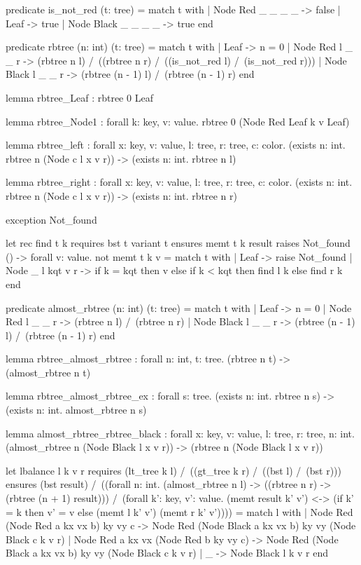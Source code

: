 \begin{whylang}
  predicate is_not_red (t: tree) =
 match t with
 | Node Red _ _ _ _ -> false
 | Leaf -> true
 | Node Black _ _ _ _ -> true
  end

  predicate rbtree (n: int) (t: tree) =
 match t with
 | Leaf -> n = 0
 | Node Red l _ _ r -> (rbtree n l) /\ ((rbtree n r) /\ ((is_not_red l) /\ (is_not_red r)))
 | Node Black l _ _ r -> (rbtree (n - 1) l) /\ (rbtree (n - 1) r)
  end

  lemma rbtree_Leaf : rbtree 0 Leaf

  lemma rbtree_Node1 : forall k: key, v: value. rbtree 0 (Node Red Leaf k v Leaf)

  lemma rbtree_left : forall x: key, v: value, l: tree, r: tree, c: color. (exists n: int. rbtree n (Node c l x v r)) -> (exists n: int. rbtree n l)

  lemma rbtree_right : forall x: key, v: value, l: tree, r: tree, c: color. (exists n: int. rbtree n (Node c l x v r)) -> (exists n: int. rbtree n r)

  exception Not_found

  let rec find t k
  requires { bst t }
  variant { t }
  ensures { memt t k result }
  raises { Not_found () -> forall v: value. not memt t k v } 
 = match t with
  | Leaf -> raise Not_found
  | Node _ l kqt v r -> if k = kqt then v else if k < kqt then find l k else find r k
  end

  predicate almost_rbtree (n: int) (t: tree) =
 match t with
 | Leaf -> n = 0
 | Node Red l _ _ r -> (rbtree n l) /\ (rbtree n r)
 | Node Black l _ _ r -> (rbtree (n - 1) l) /\ (rbtree (n - 1) r)
  end

  lemma rbtree_almost_rbtree : forall n: int, t: tree. (rbtree n t) -> (almost_rbtree n t)

  lemma rbtree_almost_rbtree_ex : forall s: tree. (exists n: int. rbtree n s) -> (exists n: int. almost_rbtree n s)

  lemma almost_rbtree_rbtree_black : forall x: key, v: value, l: tree, r: tree, n: int. (almost_rbtree n (Node Black l x v r)) -> (rbtree n (Node Black l x v r))

  let lbalance l k v r
  requires { (lt_tree k l) /\ ((gt_tree k r) /\ ((bst l) /\ (bst r))) }
  ensures { (bst result) /\ ((forall n: int. (almost_rbtree n l) -> ((rbtree n r) -> (rbtree (n + 1) result))) /\ (forall k': key, v': value. (memt result k' v') <-> (if k' = k then v' = v else (memt l k' v') \/ (memt r k' v')))) } 
 = match l with
  | Node Red (Node Red a kx vx b) ky vy c -> Node Red (Node Black a kx vx b) ky vy (Node Black c k v r)
  | Node Red a kx vx (Node Red b ky vy c) -> Node Red (Node Black a kx vx b) ky vy (Node Black c k v r)
  | _ -> Node Black l k v r
  end


\end{whylang}
